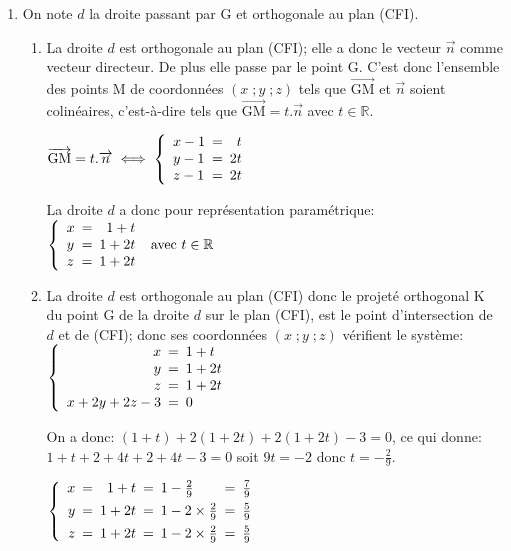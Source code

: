 \documentclass[10pt]{article}
\providecommand{\R}{\mathbb{R}}
\providecommand{\vect}[1]{\overrightarrow{#1}}
\providecommand{\vectt}[1]{\overrightarrow{\mathrm{#1}}}
\begin{document}
\begin{enumerate}
\begin{enumerate}
$\text{C} \in (\text{CFI})$ donc $x_{\text{C}}+2y_{\text{C}}+2z_{\text{C}}+d=0$ soit $1+2\times 1 +2\times 0+d=0$ donc $d=-3$.

Une équation cartésienne du plan (CFI) est donc: $x + 2y + 2z - 3 = 0$.		

	\end{enumerate}	
\item  On note $d$ la droite passant par G et orthogonale au plan (CFI).
	\begin{enumerate}
		\item 
La droite $d$ est orthogonale au plan (CFI); elle a donc le vecteur $\vect{n}$ comme vecteur directeur.
De plus elle passe par le point G.
C'est donc l'ensemble des points M de coordonnées $(x\;; y\;; z)$ tels que $\vectt{GM}$ et $\vect n$ soient colinéaires, c'est-à-dire tels que $\vectt{GM} =t.\vect n$ avec $t\in\R$.
		
$\vectt{GM} =t.\vect n
\iff
\left \{
\begin{array}{l !{=} r}
x-1 & t\\
y-1 & 2t\\
z-1 & 2t
\end{array}
\right . $		

La droite $d$ a donc pour représentation paramétrique:
$\left \{
\begin{array}{l !{=} r}
x & 1+t\\
y & 1+2t\\
z &1+ 2t
\end{array}
\right . \text{ avec }t\in\R$
		
		\item 
La droite $d$ est orthogonale au plan (CFI) donc le projeté orthogonal K du point G de la droite $d$ sur le plan (CFI), est le point d'intersection de $d$ et de (CFI); donc ses coordonnées $(x\;; y\;; z)$ vérifient le système:
$\left \{
\begin{array}{r !{=} l}
x & 1+t\\
y & 1+2t\\
z &1+ 2t\\
x+2y+2z-3 & 0
\end{array}
\right .$
		
On a donc: $(1+t) +2\left (1+2t\right ) + 2\left (1+2t\right ) -3=0$,
ce qui donne: \\
$1+t+2+4t+2+4t-3=0$
soit
$9t=-2$ donc $t=-\frac{2}{9}$.

$\left \{
\begin{array}{r !{=} r !{=} l !{=} l}
x & 1+t & 1 -\frac{2}{9} & \frac{7}{9}\\[4pt]
y & 1+2t & 1- 2\times \frac{2}{9} & \frac{5}{9}\\[4pt]
z &1+ 2t & 1- 2\times \frac{2}{9} & \frac{5}{9}
\end{array}
\right .$


\end{enumerate}
\end{enumerate}
\end{document}
